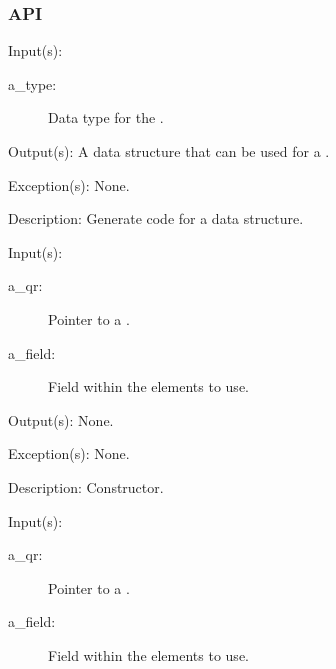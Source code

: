 \subsubsection{API}
\begin{capi}
	\begin{capilist}
	\item[Input(s): ]
		\begin{description}\item[]
		\item[a\_type: ]
			Data type for the .
		\end{description}
	\item[Output(s): ]
		A data structure that can be used for a .
	\item[Exception(s): ] None.
	\item[Description: ]
		Generate code for a  data structure.
	\end{capilist}
\label{qr_new}
	\begin{capilist}
	\item[Input(s): ]
		\begin{description}\item[]
		\item[a\_qr: ]
			Pointer to a \classname{qr}.
		\item[a\_field: ]
			Field within the  elements to use.
		\end{description}
	\item[Output(s): ] None.
	\item[Exception(s): ] None.
	\item[Description: ]
		Constructor.
	\end{capilist}
\label{qr_next}
	\begin{capilist}
	\item[Input(s): ]
		\begin{description}\item[]
		\item[a\_qr: ]
			Pointer to a .
		\item[a\_field: ]
			Field within the  elements to use.
		\end{description}

\end{capilist}
\end{capi}
